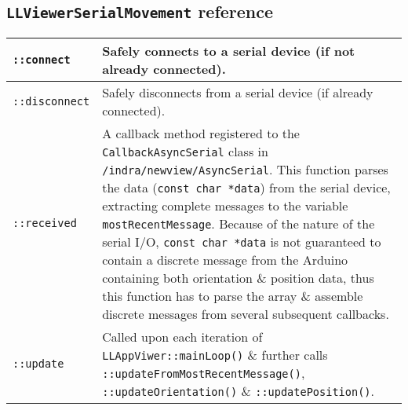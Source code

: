 
\subsection{\texttt{LLViewerSerialMovement} reference}

\begin{center}
\begin{longtable}{| p{4.2cm} | p{10cm} |}

\hline	
	
		
\texttt{::connect} & Safely connects to a serial device (if not already connected). \\
		
\hline


\texttt{::disconnect} & Safely disconnects from a serial device (if already connected). \\
		
\hline


\texttt{::received} & A callback method registered to the \texttt{CallbackAsyncSerial} class in \texttt{/indra/newview/AsyncSerial}. This function parses the data (\texttt{const char *data}) from the serial device, extracting complete messages to the variable \texttt{mostRecentMessage}. Because of the nature of the serial I/O, \texttt{const char *data} is not guaranteed to contain a discrete message from the Arduino containing both orientation \& position data, thus this function has to parse the array \& assemble discrete messages from several subsequent callbacks. \\
		
\hline


\texttt{::update} & Called upon each iteration of \texttt{LLAppViwer::mainLoop()} \& further calls \texttt{::updateFromMostRecentMessage()}, \texttt{::updateOrientation()} \& \texttt{::updatePosition()}. \\
		

\end{longtable}
\end{center}
